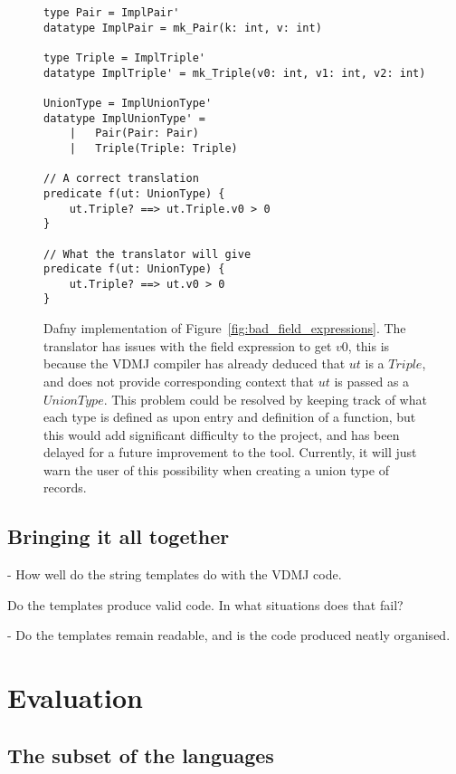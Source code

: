 \documentclass{entcs}
\begin{document}
\begin{figure}[h]
	\begin{center}
        \begin{lstlisting}
type Pair = ImplPair' 
datatype ImplPair = mk_Pair(k: int, v: int)

type Triple = ImplTriple'
datatype ImplTriple' = mk_Triple(v0: int, v1: int, v2: int)

UnionType = ImplUnionType'
datatype ImplUnionType' =
    |   Pair(Pair: Pair)
    |   Triple(Triple: Triple)

// A correct translation
predicate f(ut: UnionType) {
    ut.Triple? ==> ut.Triple.v0 > 0
}

// What the translator will give
predicate f(ut: UnionType) {
    ut.Triple? ==> ut.v0 > 0
}
        \end{lstlisting}
		\caption{Dafny implementation of Figure~\ref{fig:bad_field_expressions}. The translator has issues with the field expression to get $v0$, this is because the VDMJ compiler has already deduced that $ut$ is a $Triple$, and does not provide corresponding context that $ut$ is passed as a $UnionType$. This problem could be resolved by keeping track of what each type is defined as upon entry and definition of a function, but this would add significant difficulty to the project, and has been delayed for a future improvement to the tool. Currently, it will just warn the user of this possibility when creating a union type of records.}\label{fig:bad_field_expressions_dafny}
	\end{center}
\end{figure}

\subsection{Bringing it all together}
- How well do the string templates do with the VDMJ code.

Do the templates produce valid code. In what situations does that fail?

- Do the templates remain readable, and is the code produced neatly organised. 

\section{Evaluation}

\subsection{The subset of the languages}
\end{document}
